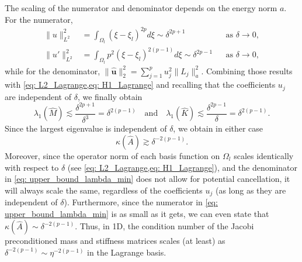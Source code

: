 \documentclass{article}
\numberwithin{equation}{section}
\newcommand{\dxi}{d\xi}
\theoremstyle{definition}
\begin{document}
The scaling of the numerator and denominator depends on the energy norm $a$. For the numerator,
\begin{align*}
    \|u\|_{L^2}^2 &= \int_{\Omega_l} (\xi-\xi_l)^{2p} \dxi \sim \delta^{2p+1} & &\text{as } \delta \to 0, \\
    \|u'\|_{L^2}^2 &= \int_{\Omega_l} p^2(\xi-\xi_l)^{2(p-1)} \dxi \sim \delta^{2p-1} & &\text{as } \delta \to 0,
\end{align*}
while for the denominator, $\|\hat{\bm{u}}\|_2^2 = \sum_{j=1}^p u_j^2 \|L_j\|_a^2$. Combining those results with \cref{eq: L2_Lagrange,eq: H1_Lagrange} and recalling that the coefficients $u_j$ are independent of $\delta$, we finally obtain
\begin{equation*}
    \lambda_1(\hat{M}) \lesssim \frac{\delta^{2p+1}}{\delta^3} = \delta^{2(p-1)} \quad \text{and} \quad \lambda_1(\hat{K}) \lesssim \frac{\delta^{2p-1}}{\delta} = \delta^{2(p-1)}.
\end{equation*}
Since the largest eigenvalue is independent of $\delta$, we obtain in either case
\begin{equation*}
    \kappa(\hat{A}) \gtrsim \delta^{-2(p-1)}.
\end{equation*}
Moreover, since the operator norm of each basis function on $\Omega_l$ scales identically with respect to $\delta$ (see \cref{eq: L2_Lagrange,eq: H1_Lagrange}), and the denominator in \eqref{eq: upper_bound_lambda_min} does not allow for potential cancellation, it will always scale the same, regardless of the coefficients $u_j$ (as long as they are independent of $\delta$). Furthermore, since the numerator in \eqref{eq: upper_bound_lambda_min} is as small as it gets, we can even state that $\kappa(\hat{A}) \sim \delta^{-2(p-1)}$. Thus, in 1D, the condition number of the Jacobi preconditioned mass and stiffness matrices scales (at least) as $\delta^{-2(p-1)} \sim \eta^{-2(p-1)}$ in the Lagrange basis. \\
\end{document}
